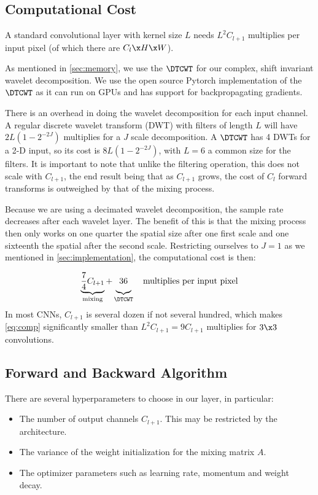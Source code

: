 \subsection{Computational Cost}\label{sec:computation}
A standard convolutional layer with kernel size $L$ needs $L^2C_{l+1}$
multiplies per input pixel (of which there are $C_{l}\x H\x W$).

As mentioned in \autoref{sec:memory}, we use the $\DTCWT$ for our complex, shift
invariant wavelet decomposition. We use the open source Pytorch implementation
of the $\DTCWT$ \cite{cotter_pytorch_2018} as it can run on GPUs and
has support for backpropagating gradients.

There is an overhead in doing the wavelet decomposition for each input channel. A
regular discrete wavelet transform (DWT) with filters of length $L$ will have
$2L\left(1-2^{-2J}\right)$ multiplies for a $J$ scale decomposition. A $\DTCWT$
has 4 DWTs for a 2-D input, so its cost is $8L\left(1-2^{-2J}\right)$, with
$L=6$ a common size for the filters. It is important to note that unlike the
filtering operation, this does not scale with $C_{l+1}$, the end result being that as
$C_{l+1}$ grows, the cost of $C_l$ forward transforms is outweighed by that of the mixing
process.

Because we are using a decimated wavelet decomposition, the sample rate decreases after each
wavelet layer. The benefit of this is that the mixing process then only works on
one quarter the spatial size after one first scale and one sixteenth the spatial
after the second scale. Restricting ourselves to $J=1$ as we mentioned in
\autoref{sec:implementation}, the computational cost is then:

\begin{equation}
  \underbrace{ \frac{7}{4}C_{l+1} }_{\textrm{mixing}} +
  \underbrace{\vphantom{\frac{7}{4}} 36}_{\DTCWT} \quad
  \textrm{multiplies per input pixel}\label{eq:comp}
\end{equation}
In most CNNs, $C_{l+1}$ is several dozen if not several
hundred, which makes \autoref{eq:comp} significantly smaller than
$L^2C_{l+1}=9C_{l+1}$ multiplies for $3\x 3$ convolutions.

\subsection{Forward and Backward Algorithm}
There are several hyperparameters to choose in our layer, in particular:
\begin{itemize}
  \item The number of output channels $C_{l+1}$. This may be restricted by the
    architecture.
  \item The variance of the weight initialization for the mixing matrix $A$.
  \item The optimizer parameters such as learning rate, momentum and weight
    decay.
\end{itemize}

